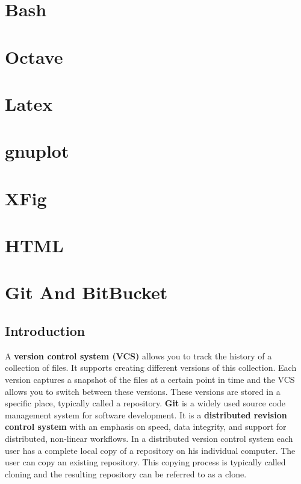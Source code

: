 \documentclass{article}
\author{}
\date{}
\begin{document}
\maketitle

\section{Bash}
\section{Octave}
\section{Latex}
\section{gnuplot}
\section{XFig}
\section{HTML}
\section{Git And BitBucket}
	\subsection{Introduction}
	A \textbf{version control system (VCS)} allows you to track the history of a collection of files. It supports creating different versions of this collection. Each version captures a snapshot of the files at a certain point in time and the VCS allows you to switch between these versions. These versions are stored in a specific place, typically called a repository.
	\textbf{Git} is a widely used source code management system for software development. It is a \textbf{distributed revision control system} with an emphasis on speed, data integrity, and support for distributed, non-linear workflows. In a distributed version control system each user has a complete local copy of a repository on his individual computer. The user can copy an existing repository. This copying process is typically called cloning and the resulting repository can be referred to as a clone.
	
\end{document}
